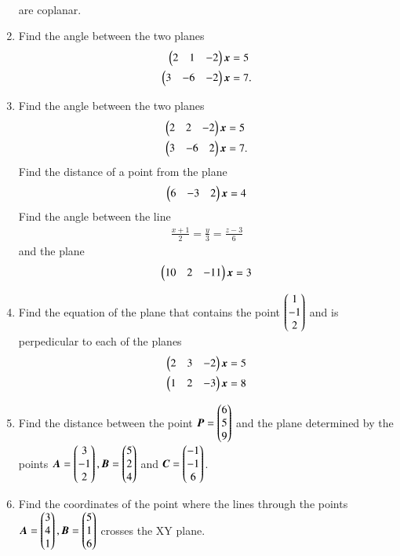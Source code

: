 \begin{enumerate}[label=\arabic*.,ref=\thesubsection.\theenumi]
\begin{align}
\end{align}
%
are coplanar.
\item Find the angle between the two planes
\begin{align}
\begin{pmatrix}2 & 1 & -2\end{pmatrix}\bm{x}&=5
\\
\begin{pmatrix}3 &-6 & -2\end{pmatrix}\bm{x}&=7.
\end{align}
%
\item Find the angle between the two planes
\begin{align}
\begin{pmatrix}2 & 2 & -2\end{pmatrix}\bm{x}&=5
\\
\begin{pmatrix}3 &-6 & 2\end{pmatrix}\bm{x}&=7.
\end{align}
%
Find the distance of a point  from the plane
\begin{align}
\begin{pmatrix}6 & -3 & 2\end{pmatrix}\bm{x}=4
\end{align}
%
Find the angle between the line 
%
\begin{align}
\frac{x+1}{2} = \frac{y}{3} = \frac{z-3}{6} 
\end{align}
%
and
%
the plane 
\begin{align}
\begin{pmatrix}10 & 2 & -11\end{pmatrix}\bm{x}=3
\end{align}
%
\item Find the equation of the plane that contains the point $\begin{pmatrix}1\\-1\\2\end{pmatrix}$ and is perpedicular to each of the planes
\begin{align}
\begin{pmatrix}2 & 3 & -2\end{pmatrix}\bm{x}&=5
\\
\begin{pmatrix}1 & 2 & -3\end{pmatrix}\bm{x}&=8
\end{align}
%
\item Find the distance between the point $\bm{P}=\begin{pmatrix}6\\5\\9\end{pmatrix}$ and the plane determined by the points $\bm{A}=\begin{pmatrix}3\\-1\\2\end{pmatrix}, \bm{B}=\begin{pmatrix}5\\2\\4\end{pmatrix}$ and $\bm{C}=\begin{pmatrix}-1\\-1\\6\end{pmatrix}$.
\item Find the coordinates of the point where the lines through the points
$
\bm{A}=\begin{pmatrix}3\\4\\1\end{pmatrix}, 
\bm{B}=\begin{pmatrix}5\\1\\6\end{pmatrix}
$
crosses the XY plane.
%
\end{enumerate}
%
